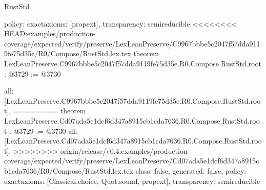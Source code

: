 \begin{lexlean}{RustStd}
\begin{coremodule}
{\begin{coremodule}
{{{{{{{  policy: exact{axioms: [propext]},
  transparency: semireducible
}
<<<<<<<< HEAD:examples/production-coverage/expected/verify/preserve/LexLeanPreserve/C9967bbbe5c2047f57dda9119fe75d35e/R0/Compose/RustStd.lex.tex
theorem LexLeanPreserve.C9967bbbe5c2047f57dda9119fe75d35e.R0.Compose.RustStd.root : @3729 := @3730 {
  all: [LexLeanPreserve.C9967bbbe5c2047f57dda9119fe75d35e.R0.Compose.RustStd.root],
========
theorem LexLeanPreserve.Cd07ada5e1dcf6d347a8915cb1cda7636.R0.Compose.RustStd.root : @3729 := @3730 {
  all: [LexLeanPreserve.Cd07ada5e1dcf6d347a8915cb1cda7636.R0.Compose.RustStd.root],
>>>>>>>> origin/release/v0.4:examples/production-coverage/expected/verify/preserve/LexLeanPreserve/Cd07ada5e1dcf6d347a8915cb1cda7636/R0/Compose/RustStd.lex.tex
  class: false,
  generated: false,
  policy: exact{axioms: [Classical.choice, Quot.sound, propext]},
  transparency: semireducible
}

}}}}}}}
\end{coremodule}}
\end{coremodule}
\end{lexlean}
